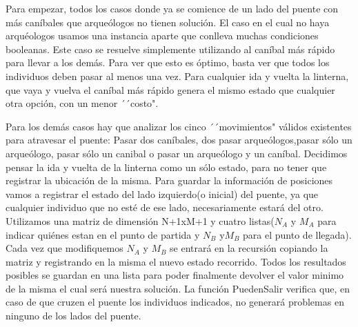 \documentclass[spanish,12pt]{article}
\begin{document}
Para empezar, todos los casos donde ya se comience de un lado del puente con más caníbales que arqueólogos no tienen solución.
El caso en el cual no haya arquéologos usamos una instancia aparte que conlleva muchas condiciones booleanas. Este caso se resuelve simplemente utilizando al caníbal más rápido para llevar a los demás. Para ver que esto es óptimo, basta ver que todos los individuos deben pasar al menos una vez. Para cualquier ida y vuelta la linterna, que vaya y vuelva el caníbal más rápido genera el mismo estado que cualquier otra opción, con un menor ´´costo".

 
Para los demás casos hay que analizar los cinco ´´movimientos"  válidos existentes para atravesar el puente: Pasar dos caníbales, dos pasar arqueólogos,pasar sólo un arqueólogo, pasar sólo un canibal o pasar un arqueólogo y un caníbal.
Decidimos pensar la ida y vuelta de la linterna como un sólo estado, para no tener que registrar la ubicación de la misma.
Para guardar la información de posiciones vamos a registrar el estado del lado izquierdo(o inicial) del puente, ya que cualquier individuo que no esté de ese lado, necesariamente estará del otro. Utilizamos una matriz de dimensión N+1xM+1 y cuatro listas($N_A$ y $M_A$ para indicar quiénes estan en el punto de partida y $N_B$ y$ M_B$ para el punto de llegada). Cada vez que modifiquemos $N_A$ y $M_B$ se entrará en la recursión copiando la matriz y registrando en la misma el nuevo estado recorrido. 
Todos los resultados posibles se guardan en una lista para poder finalmente devolver el valor minimo de la misma el cual será nuestra solución.
La función PuedenSalir verifica que, en caso de que cruzen el puente los individuos indicados, no generará problemas en ninguno de los lados del puente.
\end{document}
